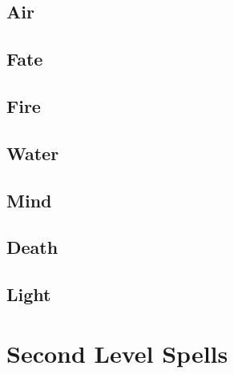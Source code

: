 \begin{multicols}{2}

\subsection{Air}



\subsection{Fate}



\subsection{Fire}



\subsection{Water}



\subsection{Mind}



\subsection{Death}



\subsection{Light}



\end{multicols}

\section{Second Level Spells}

